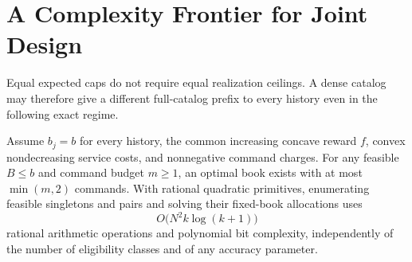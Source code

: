 \section{A Complexity Frontier for Joint Design}\label{sec:caps54}
Equal expected caps do not require equal realization ceilings. A dense catalog may therefore give a different full-catalog prefix to every history even in the following exact regime.
\begin{theorem}\label{thm:twocommand54}
Assume $b_j=b$ for every history, the common increasing concave reward $f$, convex nondecreasing service costs, and nonnegative command charges. For any feasible $B\leq b$ and command budget $m\geq1$, an optimal book exists with at most $\min(m,2)$ commands. With rational quadratic primitives, enumerating feasible singletons and pairs and solving their fixed-book allocations uses
\[
 O\bigl(N^2k\log(k+1)\bigr)
\]
rational arithmetic operations and polynomial bit complexity, independently of the number of eligibility classes and of any accuracy parameter.
\end{theorem}
